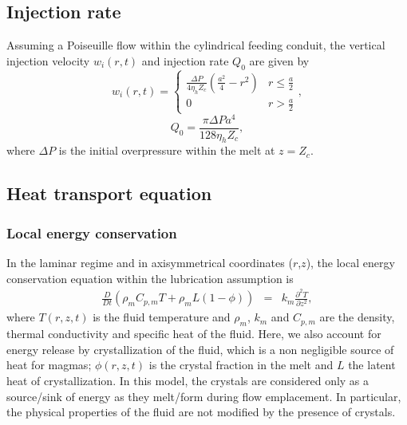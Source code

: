 \subsection{Injection rate}

Assuming a Poiseuille flow within the cylindrical feeding conduit, the
vertical injection  velocity $w_i(r,t)$  and injection rate  $Q_0$ are
given by
\begin{equation}
  w_i(r,t)=
  \begin{cases}
    \frac{ \Delta P}{4 \eta_h Z_{c}} (\frac{a^{2}}{4}-r^{2})& r \le \frac{a}{2}\\
    0 & r > \frac{a}{2}
  \end{cases},
  \label{C3-eq12}
\end{equation}
\begin{equation}
  Q_{0}=\frac{\pi \Delta P a^{4}}{128 \eta_h Z_c},
  \label{C3-eq11}
\end{equation}
where  $\Delta P$  is  the  initial overpressure  within  the melt  at
$z=Z_{c}$.

\subsection{Heat transport equation}
\subsubsection*{Local energy conservation}

In the laminar regime and in axisymmetrical coordinates ($r$,$z$), the
local energy  conservation equation within the  lubrication assumption
is
\begin{eqnarray}
  \frac{D}{D t}\left(\rho_m C_{p,m} T+\rho_mL(1-\phi)\right)&=& k_m  \frac{\partial^2
                                                                T}{\partial               z^2},\label{C3-EnergyCons}
\end{eqnarray}
where  $T(r,z,t)$ is  the fluid  temperature and  $\rho_m$, $k_m$  and
$C_{p,m}$ are the  density, thermal conductivity and  specific heat of
the   fluid.   Here,   we   also  account   for   energy  release   by
crystallization of the fluid, which is a non negligible source of heat
for magmas; $\phi(r,z,t)$ is the crystal  fraction in the melt and $L$
the latent heat  of crystallization.  In this model,  the crystals are
considered only  as a source/sink  of energy as they  melt/form during
flow emplacement.  In particular, the physical properties of the fluid
are not modified by the presence of crystals.


